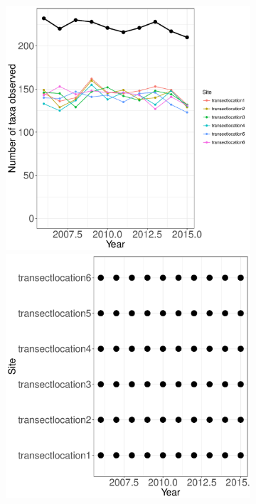 \documentclass[11pt, oneside]{article}
\begin{document}
\begin{figure}[h!]
\begin{figure}[h!]
\includegraphics[scale = 0.4]{mcr-fish-castorani_num_taxa_over_time.pdf}
\includegraphics[scale = 0.4]{mcr-fish-castorani_spatiotemporal_sampling_effort.pdf}

\end{figure}
\end{figure}
\end{document}
